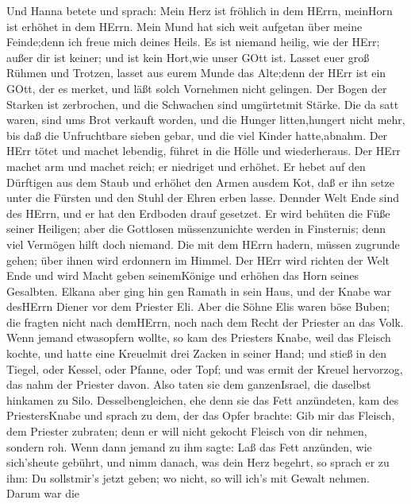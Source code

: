  Und Hanna betete und sprach: Mein Herz ist fröhlich in dem
HErrn, meinHorn ist erhöhet in dem HErrn. Mein Mund hat sich weit
aufgetan über meine Feinde;denn ich freue mich deines Heils.
 Es ist niemand heilig, wie der HErr; außer dir ist keiner;
und ist kein Hort,wie unser GOtt ist.  Lasset euer groß
Rühmen und Trotzen, lasset aus eurem Munde das Alte;denn der HErr ist
ein GOtt, der es merket, und läßt solch Vornehmen nicht gelingen.
 Der Bogen der Starken ist zerbrochen, und die Schwachen
sind umgürtetmit Stärke.  Die da satt waren, sind ums Brot
verkauft worden, und die Hunger litten,hungert nicht mehr, bis daß die
Unfruchtbare sieben gebar, und die viel Kinder hatte,abnahm.
 Der HErr tötet und machet lebendig, führet in die Hölle und
wiederheraus.  Der HErr machet arm und machet reich; er
niedriget und erhöhet.  Er hebet auf den Dürftigen aus dem
Staub und erhöhet den Armen ausdem Kot, daß er ihn setze unter die
Fürsten und den Stuhl der Ehren erben lasse. Dennder Welt Ende sind des
HErrn, und er hat den Erdboden drauf gesetzet.  Er wird
behüten die Füße seiner Heiligen; aber die Gottlosen müssenzunichte
werden in Finsternis; denn viel Vermögen hilft doch niemand.
 Die mit dem HErrn hadern, müssen zugrunde gehen; über
ihnen wird erdonnern im Himmel. Der HErr wird richten der Welt Ende und
wird Macht geben seinemKönige und erhöhen das Horn seines Gesalbten.
 Elkana aber ging hin gen Ramath in sein Haus, und der
Knabe war desHErrn Diener vor dem Priester Eli.  Aber die
Söhne Elis waren böse Buben; die fragten nicht nach demHErrn,
 noch nach dem Recht der Priester an das Volk. Wenn jemand
etwasopfern wollte, so kam des Priesters Knabe, weil das Fleisch kochte,
und hatte eine Kreuelmit drei Zacken in seiner Hand;  und
stieß in den Tiegel, oder Kessel, oder Pfanne, oder Topf; und was ermit
der Kreuel hervorzog, das nahm der Priester davon. Also taten sie dem
ganzenIsrael, die daselbst hinkamen zu Silo. 
Desselbengleichen, ehe denn sie das Fett anzündeten, kam des
PriestersKnabe und sprach zu dem, der das Opfer brachte: Gib mir das
Fleisch, dem Priester zubraten; denn er will nicht gekocht Fleisch von
dir nehmen, sondern roh.  Wenn dann jemand zu ihm sagte:
Laß das Fett anzünden, wie sich'sheute gebührt, und nimm danach, was
dein Herz begehrt, so sprach er zu ihm: Du sollstmir's jetzt geben; wo
nicht, so will ich's mit Gewalt nehmen.  Darum war die
